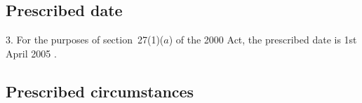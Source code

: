 \documentclass[12pt,a4paper]{article}
\begin{document}
\subsection[3. Prescribed date]{Prescribed date}

3.  For the purposes of section~27(1)($a$)  of the 2000 Act, the prescribed date is 1st April 
2005%
.


\subsection[4. Prescribed circumstances]{Prescribed circumstances}
\end{document}
